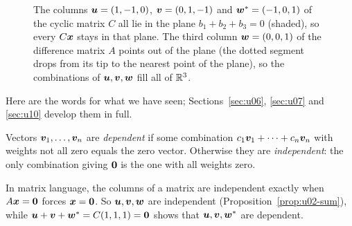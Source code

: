 \begin{figure}[ht]
\centering
{}
\caption{The columns $\boldsymbol{u}=(1,-1,0)$, $\boldsymbol{v}=(0,1,-1)$ and $\boldsymbol{w}^{*}=(-1,0,1)$ of the
cyclic matrix $C$ all lie in the plane $b_1+b_2+b_3=0$ (shaded), so every $C\boldsymbol{x}$ stays in
that plane. The third column $\boldsymbol{w}=(0,0,1)$ of the difference matrix $A$ points out of the
plane (the dotted segment drops from its tip to the nearest point of the plane), so the
combinations of $\boldsymbol{u},\boldsymbol{v},\boldsymbol{w}$ fill all of $\mathbb{R}^3$.}\label{fig:u02-plane}
\end{figure}

Here are the words for what we have seen; Sections~\ref{sec:u06}, \ref{sec:u07} and
\ref{sec:u10} develop them in full.

\begin{definition}\label{def:u02-independent}
Vectors $\boldsymbol{v}_1,\dots,\boldsymbol{v}_n$ are \emph{dependent} if some combination
$c_1\boldsymbol{v}_1+\cdots+c_n\boldsymbol{v}_n$ with weights not all zero equals the zero vector. Otherwise
they are \emph{independent}: the only combination giving $\boldsymbol{0}$ is the one with all
weights zero.
\end{definition}

In matrix language, the columns of a matrix are independent exactly when $A\boldsymbol{x}=\boldsymbol{0}$
forces $\boldsymbol{x}=\boldsymbol{0}$. So $\boldsymbol{u},\boldsymbol{v},\boldsymbol{w}$ are independent
(Proposition~\ref{prop:u02-sum}), while $\boldsymbol{u}+\boldsymbol{v}+\boldsymbol{w}^{*}=C(1,1,1)=\boldsymbol{0}$ shows that
$\boldsymbol{u},\boldsymbol{v},\boldsymbol{w}^{*}$ are dependent.

